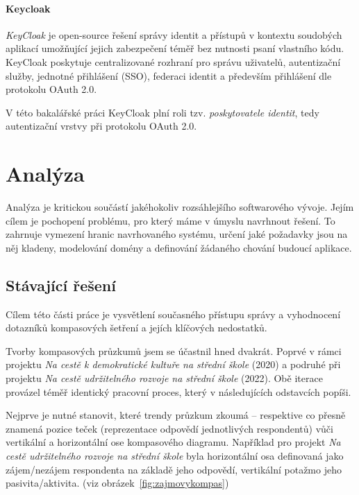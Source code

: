 \subsubsection{Keycloak}
\label{subsection:keycloak}
\textit{KeyCloak} je open-source řešení správy identit a přístupů v kontextu soudobých aplikací
umožňující jejich zabezpečení téměř bez nutnosti psaní vlastního kódu. KeyCloak poskytuje centralizované rozhraní 
pro správu uživatelů, autentizační služby, jednotné přihlášení (SSO), federaci identit a především
přihlášení dle protokolu OAuth 2.0.~\cite{keycloakreview}

V této bakalářské práci KeyCloak plní roli tzv. \textit{poskytovatele identit}, tedy 
autentizační vrstvy při protokolu OAuth 2.0.~\cite{keycloakdocs}

\chapter{Analýza}
Analýza je kritickou součástí jakéhokoliv rozsáhlejšího softwarového vývoje. Jejím cílem je pochopení problému, pro který máme v úmyslu navrhnout řešení. To zahrnuje vymezení hranic navrhovaného systému, určení jaké požadavky jsou na něj kladeny, modelování domény a definování žádaného chování budoucí aplikace.

\section{Stávající řešení}
Cílem této části práce je vysvětlení současného přístupu správy a vyhodnocení dotazníků kompasových šetření a jejích klíčových nedostatků.

Tvorby kompasových průzkumů jsem se účastnil hned dvakrát. Poprvé v rámci projektu \textit{Na cestě k demokratické kultuře na střední škole} (2020) a podruhé při projektu \textit{Na cestě udržitelného rozvoje na střední škole} (2022). Obě iterace provázel téměř identický pracovní proces, který v následujících odstavcích popíši.

Nejprve je nutné stanovit, které trendy průzkum zkoumá – respektive co přesně znamená pozice teček (reprezentace odpovědí jednotlivých respondentů) vůči vertikální a horizontální ose kompasového diagramu. Například pro projekt \textit{Na cestě udržitelného rozvoje na střední škole} byla horizontální osa definovaná jako zájem/nezájem respondenta na základě jeho odpovědí, vertikální potažmo jeho pasivita/aktivita. (viz obrázek~\ref{fig:zajmovykompas})

